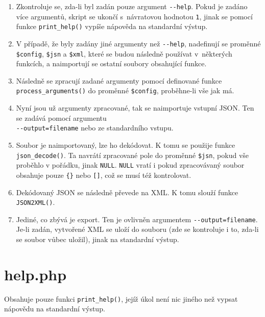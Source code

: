 \documentclass[a4paper, 10pt]{article}
\begin{document}
\begin{enumerate}
	\setlength\itemsep{0pt}

	\item Zkontroluje se, zda-li byl zadán pouze argument \verb|--help|. Pokud je zadáno více argumentů, skript se ukončí s~návratovou hodnotou \verb|1|, jinak se pomocí funkce \verb|print_help()| vypíše nápověda na standardní výstup.
	
	\item V případě, že byly zadány jiné argumenty než \verb|--help|, nadefinují se proměnné \verb|$config|, \verb|$jsn| a \verb|$xml|, které se budou následně používat v~některých funkcích, a naimportují se ostatní soubory obsahující funkce.
	
	\item Následně se zpracují zadané argumenty pomocí definované funkce \verb|process_arguments()| do proměnné \verb|$config|, proběhne-li vše jak má.
	
	\item Nyní jsou už argumenty zpracované, tak se naimportuje vstupní JSON. Ten se zadává pomocí argumentu\\ \verb|--output=filename| nebo ze standardního vstupu.
	
	\item Soubor je naimportovaný, lze ho dekódovat. K tomu se použije funkce \verb|json_decode()|. Ta navrátí zpracované pole do proměnné \verb|$jsn|, pokud vše proběhlo v pořádku, jinak \verb|NULL|. \verb|NULL| vratí i pokud zpracovávaný soubor obsahuje pouze \verb|{}| nebo \verb|[]|, což se musí též kontrolovat.
	
	\item Dekódovaný JSON se následně převede na XML. K tomu slouží funkce \verb|JSON2XML()|.
	
	\item Jediné, co zbývá je export. Ten je ovlivněn argumentem \verb|--output=filename|. Je-li zadán, vytvořené XML se uloží do souboru (zde se kontroluje i to, zda-li se soubor vůbec uložil), jinak na standardní výstup.
	
\end{enumerate}

\section{help.php}

Obsahuje pouze funkci \verb|print_help()|, jejíž úkol není nic jiného než vypsat nápovědu na standardní výstup.
\end{document}
